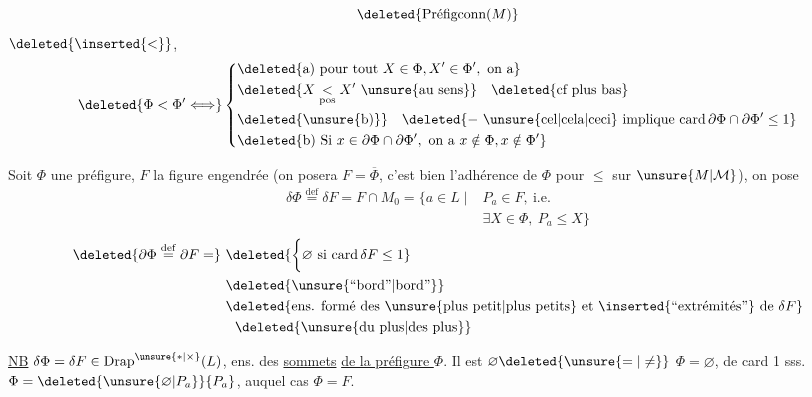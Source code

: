 \[
 \deleted{\text{Préfigconn}(M)}
\]
 $\deleted{\inserted{<}}$, 
\[
 \deleted{\Phi<\Phi'\Longleftrightarrow}
 \left\{\begin{aligned}
 &\deleted{\text{a) pour tout }X\in\Phi,X'\in\Phi',\ \text{on a}}\\
 &\deleted{X\underset{\mathrm{pos}}{<}X'\ \text{\unsure{au sens}}}\quad\deleted{\text{cf plus bas}}\\
 &\deleted{\text{\unsure{b)}}}\quad\deleted{-\ \text{\unsure{cel|cela|ceci} implique }\mathrm{card}\,\partial\Phi\cap\partial\Phi'\leq1}\\
 &\deleted{\text{b) Si }x\in\partial\Phi\cap\partial\Phi',\ \text{on a }x\notin\Phi,x\notin\Phi'}
 \end{aligned}\right.
\]

Soit $\Phi$ une préfigure, $F$ la figure engendrée (on posera $F=\overline{\Phi}$, c'est bien l'adhérence de $\Phi$ pour $\leq$ sur $\unsure{M|\mathcal M}$), on pose
\[
\begin{aligned}
\delta\Phi\overset{\mathrm{def}}{=}\delta F=F\cap M_0
  =\bigl\{a\in L\mid{}& P_a\in F,\ \text{i.e.}\\[-2pt]
  &\exists X\in\Phi,\ P_a\leq X\bigr\}
\end{aligned}
\]
\[
\begin{aligned}
\deleted{\partial\Phi\overset{\mathrm{def}}{=}\partial F=}
&\ \deleted{\biggl\{\varnothing\ \text{si }\mathrm{card}\,\delta F\leq1}\\
&\ \deleted{\text{\unsure{``bord''|bord''}}}\\
&\ \deleted{\text{ens. formé des }\unsure{\text{plus petit}|\text{plus petits}}\text{ et }\inserted{\text{``extrémités''}}\text{ de }\delta F}\\
&\quad\deleted{\text{\unsure{du plus|des plus}}}
\end{aligned}
\]

\uline{NB} $\delta\Phi=\delta F\in\mathrm{Drap}^{\unsure{*|\times}}(L)$, ens. des   \uline{sommets}  \uline{de la préfigure $\Phi$}. Il est $\varnothing\deleted{\unsure{=|\ne}}$  $\Phi=\varnothing$,  de card 1 sss. $\Phi=\deleted{\unsure{\varnothing|P_a}}\{P_a\}$, auquel cas $\Phi=F$.

